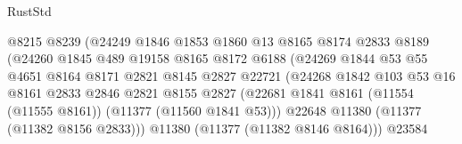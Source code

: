 \begin{lexlean}{RustStd}
\begin{coremodule}
                                      @8215
                                      @8239
                                      (@24249
                                        @1846
                                        @1853
                                        @1860
                                        @13
                                        @8165
                                        @8174
                                        @2833
                                        @8189
                                        (@24260
                                          @1845
                                          @489
                                          @19158
                                          @8165
                                          @8172
                                          @6188
                                          (@24269
                                            @1844
                                            @53
                                            @55
                                            @4651
                                            @8164
                                            @8171
                                            @2821
                                            @8145
                                            @2827
                                            @22721
                                            (@24268
                                              @1842
                                              @103
                                              @53
                                              @16
                                              @8161
                                              @2833
                                              @2846
                                              @2821
                                              @8155
                                              @2827
                                              (@22681
                                                @1841
                                                @8161
                                                (@11554 (@11555 @8161))
                                                (@11377 (@11560 @1841 @53)))
                                              @22648
                                              @11380
                                              (@11377 (@11382 @8156 @2833)))
                                            @11380
                                            (@11377 (@11382 @8146 @8164)))
                                          @23584

\end{coremodule}
\end{lexlean}
